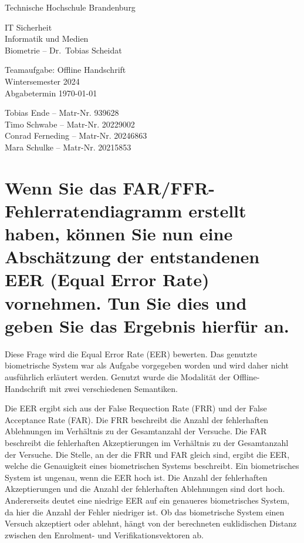 \documentclass{article}
\begin{document}
\begin{titlepage}
	\begin{center}
		\begin{Large}
			Technische Hochschule Brandenburg \\[1em]
		\end{Large}
		
		IT Sicherheit \\
		Informatik und Medien \\
		Biometrie – Dr.\ Tobias Scheidat
	\end{center}
	
	\vfill

	\begin{center}
		\Large{Teamaufgabe: Offline Handschrift}\\[0.5em]
		\large{Wintersemester 2024}\\[0.25em]
		\large{Abgabetermin \today}
	\end{center}

	\vfill

	\begin{center}
		Tobias Ende – Matr-Nr. 939628 \\
		Timo Schwabe – Matr-Nr. 20229002 \\
		Conrad Ferneding – Matr-Nr. 20246863 \\
		Mara Schulke – Matr-Nr. 20215853 \\
	\end{center}
\end{titlepage}


\tableofcontents

\listoffigures

\newpage

\section{Wenn Sie das FAR/FFR-Fehlerratendiagramm erstellt haben, können Sie nun eine Abschätzung der entstandenen EER (Equal Error Rate) vornehmen. Tun Sie dies und geben Sie das Ergebnis hierfür an.}

Diese Frage wird die Equal Error Rate (EER) bewerten. Das genutzte biometrische System war als Aufgabe 
vorgegeben worden und wird daher nicht ausführlich erläutert werden. Genutzt wurde die Modalität der 
Offline-Handschrift mit zwei verschiedenen Semantiken.

Die EER ergibt sich aus der False Requection Rate (FRR) und der False Acceptance Rate (FAR). Die FRR 
beschreibt die Anzahl der fehlerhaften Ablehnungen im Verhältnis zu der Gesamtanzahl der Versuche. Die FAR 
beschreibt die fehlerhaften Akzeptierungen im Verhältnis zu der Gesamtanzahl der Versuche. Die Stelle, an 
der die FRR und FAR gleich sind, ergibt die EER, welche die Genauigkeit eines biometrischen Systems 
beschreibt. Ein biometrisches System ist ungenau, wenn die EER hoch ist. Die Anzahl der fehlerhaften 
Akzeptierungen und die Anzahl der fehlerhaften Ablehnungen sind dort hoch. Andererseits deutet eine 
niedrige EER auf ein genaueres biometrisches System, da hier die Anzahl der Fehler niedriger ist. Ob das 
biometrische System einen Versuch akzeptiert oder ablehnt, hängt von der berechneten euklidischen Distanz 
zwischen den Enrolment- und Verifikationsvektoren ab.
\end{document}
